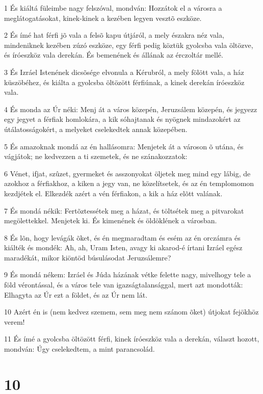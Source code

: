 \par 1 És kiáltá füleimbe nagy felszóval, mondván: Hozzátok el a városra a meglátogatásokat, kinek-kinek a kezében legyen vesztõ eszköze.
\par 2 És ímé hat férfi jõ vala a felsõ kapu útjáról, a mely északra néz vala, mindeniknek kezében zúzó eszköze, egy férfi pedig köztük gyolcsba vala öltözve, és íróeszköz vala derekán. És bemenének és állának az érczoltár mellé.
\par 3 És Izráel Istenének dicsõsége elvonula a Kérubról, a mely fölött vala, a ház küszöbéhez, és kiálta a gyolcsba öltözött férfiúnak, a kinek derekán  íróeszköz vala.
\par 4 És monda az Úr néki: Menj át a város közepén, Jeruzsálem közepén, és jegyezz egy jegyet a férfiak homlokára, a kik sóhajtanak és nyögnek mindazokért az útálatosságokért, a melyeket cselekedtek annak közepében.
\par 5 És amazoknak mondá az én hallásomra: Menjetek át a városon õ utána, és vágjátok; ne kedvezzen a ti szemetek, és ne szánakozzatok:
\par 6 Vénet, ifjat, szûzet, gyermeket és asszonyokat öljetek meg mind egy lábig, de azokhoz a férfiakhoz, a kiken a jegy van, ne közelítsetek, és az én templomomon kezdjétek el. Elkezdék azért a vén férfiakon,  a kik a ház elõtt valának.
\par 7 És mondá nékik: Fertõztessétek meg a házat, és töltsétek meg a pitvarokat megölettekkel. Menjetek ki. És kimenének és öldöklének a városban.
\par 8 És lõn, hogy levágák õket, és én megmaradtam és esém az én orczámra és kiálték és mondék: Ah, ah, Uram Isten, avagy ki akarod-é írtani Izráel egész maradékát, mikor kiöntöd búsulásodat Jeruzsálemre?
\par 9 És mondá nékem: Izráel és Júda házának vétke felette nagy, mivelhogy tele a föld  vérontással, és a város tele van igazságtalansággal, mert azt mondották: Elhagyta az Úr ezt a földet, és az Úr nem lát.
\par 10 Azért én is (nem kedvez szemem, sem meg nem szánom õket) útjokat fejökhöz verem!
\par 11 És ímé a gyolcsba öltözött férfi, kinek íróeszköz vala a derekán, választ hozott, mondván: Úgy cselekedtem, a mint parancsolád.

\chapter{10}

